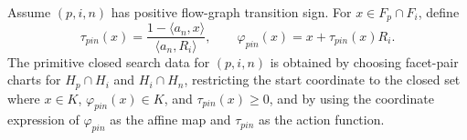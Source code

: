 \begin{unverified}
\begin{definition}%
\label{def:fg-primitive-tube}
Assume \((p,i,n)\) has positive flow-graph transition sign.  For
\(x\in F_p\cap F_i\), define
\[
  \tau_{pin}(x)
  =
  \frac{1-\langle a_n,x\rangle}{\langle a_n,R_i\rangle},
  \qquad
  \varphi_{pin}(x)=x+\tau_{pin}(x)R_i .
\]
The primitive closed search data for \((p,i,n)\) is obtained by choosing
facet-pair charts for \(H_p\cap H_i\) and \(H_i\cap H_n\), restricting
the start coordinate to the closed set where \(x\in K\),
\(\varphi_{pin}(x)\in K\), and \(\tau_{pin}(x)\geq0\), and by using the
coordinate expression of \(\varphi_{pin}\) as the affine map and
\(\tau_{pin}\) as the action function.
\end{definition}
\end{unverified}

